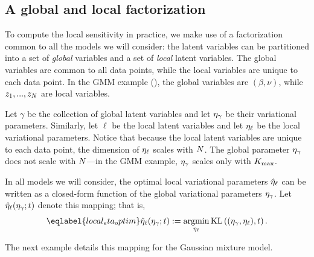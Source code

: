 \subsection{A global and local factorization}

To compute the local sensitivity in practice, we
make use of a factorization common to all the models we will consider:
the latent variables can be partitioned into a set of \textit{global}
variables and a set of \textit{local} latent variables.
The global variables are common to all data points, while the local variables
are unique to each data point.
In the GMM example (),
the global variables are $(\beta, \nu)$,
while $z_1, ..., z_N$ are local variables.

Let $\gamma$ be the collection of global latent variables
and let $\eta_{\gamma}$ be their variational parameters.
Similarly, let $\ell$ be the local latent variables and
let $\eta_{\ell}$ be the local variational parameters.
Notice that because the local latent variables are unique to each data point,
the dimension of $\eta_{\ell}$ scales with $N$.
The global parameter $\eta_{\gamma}$ does not scale with $N$---in the GMM example,
$\eta_{\gamma}$ scales only with ${K_{\mathrm{max}}}$.

In all models we will consider,
the optimal local variational parameters $\hat\eta_{\ell}$ can be written
as a closed-form function of the global variational parameters $\eta_{\gamma}$.
Let $\hat\eta_{\ell}(\eta_\gamma; t)$ denote this mapping; that is,
\begin{align}\eqlabel{local_eta_optim}
  \etaoptlocal(\etaglob; \t) := \argmin_{\etalocal} \KL{(\eta_\gamma, \etalocal), \t}.
\end{align}

The next example details this mapping for the Gaussian mixture model.

